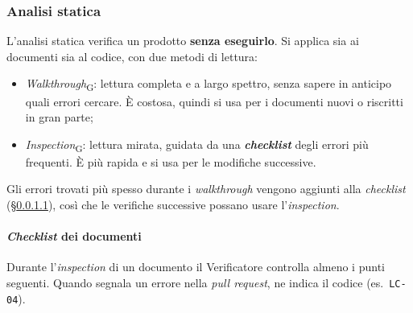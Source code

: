 \documentclass[12pt,a4paper]{article}
\newcommand{\tightlist}{\setlength{\itemsep}{1pt}\setlength{\parskip}{0pt}}
\newcommand{\gl}[1]{\emph{#1}\textsubscript{\scriptsize G}}
\begin{document}
\subsubsection{Analisi statica}
L'analisi statica verifica un prodotto \textbf{senza eseguirlo}. Si applica sia ai documenti sia al codice, con due metodi di lettura:
\begin{itemize}
\tightlist
\item \gl{Walkthrough}: lettura completa e a largo spettro, senza sapere in anticipo quali errori cercare. È costosa, quindi si usa per i documenti nuovi o riscritti in gran parte;
\item \gl{Inspection}: lettura mirata, guidata da una \textbf{\emph{checklist}} degli errori più frequenti. È più rapida e si usa per le modifiche successive.
\end{itemize}
Gli errori trovati più spesso durante i \emph{walkthrough} vengono aggiunti alla \emph{checklist} (§\ref{sec:checklist}), così che le verifiche successive possano usare l'\emph{inspection}.

\paragraph{\emph{Checklist} dei documenti}\label{sec:checklist}
Durante l'\emph{inspection} di un documento il Verificatore controlla almeno i punti seguenti. Quando segnala un errore nella \emph{pull request}, ne indica il codice (es.\ \texttt{LC-04}).
\end{document}
